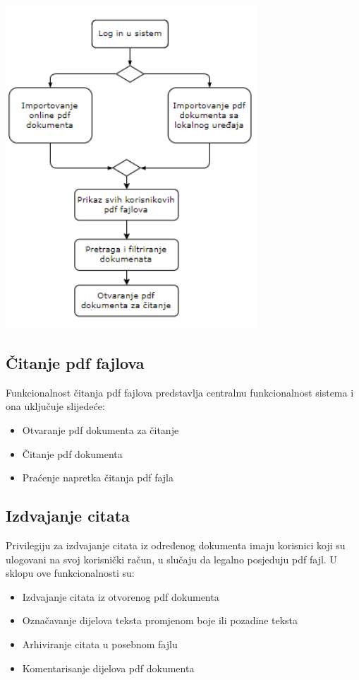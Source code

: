 \begin{center}
    \includegraphics[scale=0.8]{images/FunkcionalniZahtjevi.png}
\end{center}


\subsection{Čitanje pdf fajlova}
Funkcionalnost čitanja pdf fajlova predstavlja centralnu funkcionalnost sistema i ona uključuje slijedeće:
\begin{itemize}
  \item Otvaranje pdf dokumenta za čitanje
  \item Čitanje pdf dokumenta
  \item Praćenje napretka čitanja pdf fajla
\end{itemize}

\subsection{Izdvajanje citata}
Privilegiju za izdvajanje citata iz određenog dokumenta imaju korisnici koji su ulogovani na svoj korisnički račun, u slučaju da legalno posjeduju pdf fajl. U sklopu ove  funkcionalnosti su:
\begin{itemize}
  \item Izdvajanje citata iz otvorenog pdf dokumenta
  \item Označavanje dijelova teksta promjenom boje ili pozadine teksta
  \item Arhiviranje citata u posebnom fajlu
  \item Komentarisanje dijelova pdf dokumenta
\end{itemize}


